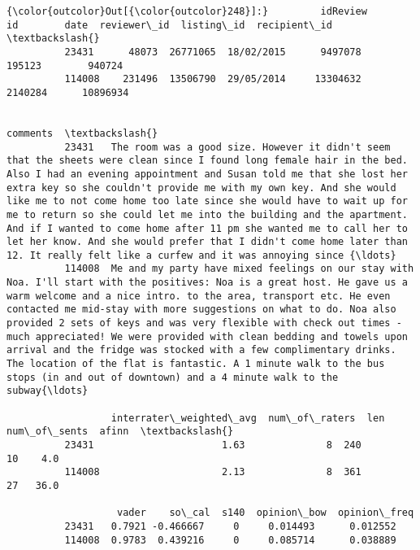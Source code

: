 \documentclass[11pt]{article}
\begin{document}
\begin{Verbatim}[commandchars=\\\{\}]
{\color{outcolor}Out[{\color{outcolor}248}]:}         idReview        id        date  reviewer\_id  listing\_id  recipient\_id  \textbackslash{}
          23431      48073  26771065  18/02/2015      9497078      195123        940724   
          114008    231496  13506790  29/05/2014     13304632     2140284      10896934   
          
                                                                                                                                                                                                                                                                                                                                                                                                                                                                                                                                                                                                                                 comments  \textbackslash{}
          23431   The room was a good size. However it didn't seem that the sheets were clean since I found long female hair in the bed. Also I had an evening appointment and Susan told me that she lost her extra key so she couldn't provide me with my own key. And she would like me to not come home too late since she would have to wait up for me to return so she could let me into the building and the apartment. And if I wanted to come home after 11 pm she wanted me to call her to let her know. And she would prefer that I didn't come home later than 12. It really felt like a curfew and it was annoying since {\ldots}   
          114008  Me and my party have mixed feelings on our stay with Noa. I'll start with the positives: Noa is a great host. He gave us a warm welcome and a nice intro. to the area, transport etc. He even contacted me mid-stay with more suggestions on what to do. Noa also provided 2 sets of keys and was very flexible with check out times - much appreciated! We were provided with clean bedding and towels upon arrival and the fridge was stocked with a few complimentary drinks. The location of the flat is fantastic. A 1 minute walk to the bus stops (in and out of downtown) and a 4 minute walk to the subway{\ldots}   
          
                  interrater\_weighted\_avg  num\_of\_raters  len  num\_of\_sents  afinn  \textbackslash{}
          23431                      1.63              8  240            10    4.0   
          114008                     2.13              8  361            27   36.0   
          
                   vader    so\_cal  s140  opinion\_bow  opinion\_freq  
          23431   0.7921 -0.466667     0     0.014493      0.012552  
          114008  0.9783  0.439216     0     0.085714      0.038889  
\end{Verbatim}
            
\end{document}
